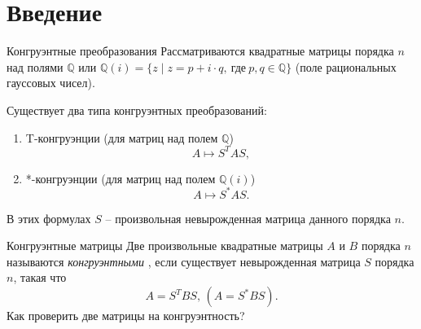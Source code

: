 \documentclass[10pt,pdf,hyperref={unicode}]{beamer}
\begin{document}
\section{Введение}
\begin{frame}{Конгруэнтные преобразования}
    Рассматриваются квадратные матрицы порядка $n$ над полями $\mathbb{Q}$ или $\mathbb{Q}(i) = \{z \mid z = p + i\cdot q,~\text{где}~p,q\in\mathbb{Q}\}$ (поле рациональных гауссовых чисел).

    Существует два типа конгруэнтных преобразований:
    \begin{enumerate}
        \item T-конгруэнции (для матриц над полем $\mathbb{Q}$)
        \begin{equation*}
            A \mapsto S^TAS,
        \end{equation*}
        \item *-конгруэнции (для матриц над полем $\mathbb{Q}(i)$)
        \begin{equation*}
            A \mapsto S^*AS.
        \end{equation*}
    \end{enumerate}



В этих формулах $S$ -- произвольная невырожденная матрица данного порядка $n$.
\end{frame}
\begin{frame}{Конгруэнтные матрицы}
    Две произвольные квадратные матрицы $A$ и $B$ порядка $n$ называются \textit{конгруэнтными} , если существует невырожденная матрица $S$ порядка $n$, такая что 
\begin{equation*}
    A = S^TBS, \, (A = S^*BS).
\end{equation*}
Как проверить две матрицы на конгруэнтность?

\end{frame}
\end{document}
